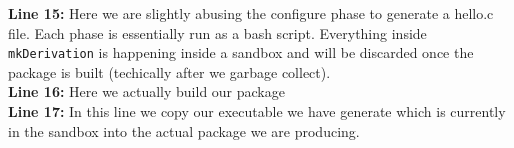 \textbf{Line 15:} Here we are slightly abusing the configure phase to generate a hello.c file. Each phase is essentially run as a bash script. Everything inside \texttt{mkDerivation} is happening inside a sandbox and will be discarded once the package is built (techically after we garbage collect). \\

\textbf{Line 16:} Here we actually build our package \\

\textbf{Line 17:} In this line we copy our executable we have generate which is currently in the sandbox into the actual package we are producing. \\
